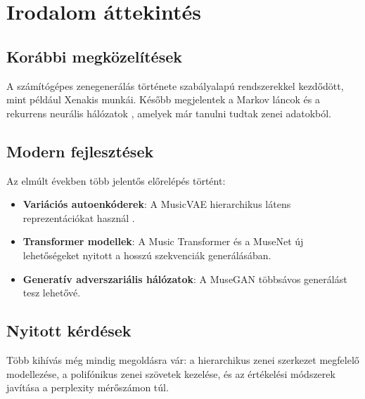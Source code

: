\chapter{Irodalom áttekintés}
\section{Korábbi megközelítések}

A számítógépes zenegenerálás története szabályalapú rendszerekkel kezdődött, mint például Xenakis munkái. Később megjelentek a Markov láncok \cite{carvalho2019markov} és a rekurrens neurális hálózatok \cite{eck2002learning}, amelyek már tanulni tudtak zenei adatokból.

\section{Modern fejlesztések}

Az elmúlt években több jelentős előrelépés történt:

\begin{itemize}
    \item \textbf{Variációs autoenkóderek}: A MusicVAE hierarchikus látens reprezentációkat használ \cite{roberts2018hierarchical}.
    \item \textbf{Transformer modellek}: A Music Transformer \cite{huang2018music} és a MuseNet új lehetőségeket nyitott a hosszú szekvenciák generálásában.
    \item \textbf{Generatív adverszariális hálózatok}: A MuseGAN \cite{dong2017musegan} többsávos generálást tesz lehetővé.
\end{itemize}

\section{Nyitott kérdések}

Több kihívás még mindig megoldásra vár: a hierarchikus zenei szerkezet megfelelő modellezése, a polifónikus zenei szövetek kezelése, és az értékelési módszerek javítása a perplexity mérőszámon túl.


